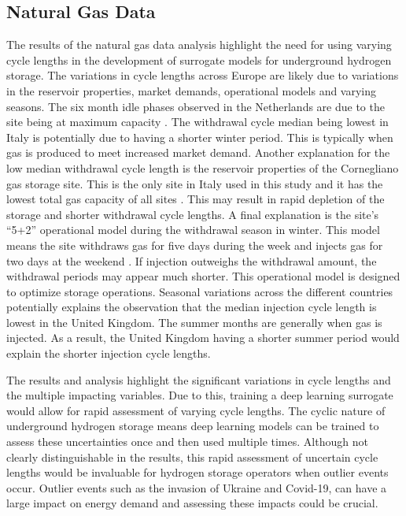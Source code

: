 \subsection{Natural Gas Data}
The results of the natural gas data analysis highlight the need for using varying cycle lengths in the development of surrogate models for underground hydrogen storage. The variations in cycle lengths across Europe are likely due to variations in the reservoir properties, market demands, operational models and varying seasons. The six month idle phases observed in the Netherlands are due to the site being at maximum capacity \citep{AGSI_data}. The withdrawal cycle median being lowest in Italy is potentially due to having a shorter winter period. This is typically  when gas is produced to meet increased market demand. Another explanation for the low median withdrawal cycle length is the reservoir properties of the  Cornegliano gas storage site. This is the only site in Italy used in this study and it has the lowest total gas capacity of all sites \citep{AGSI_data}. This may result in rapid depletion of the storage and shorter withdrawal cycle lengths. A final explanation is the site's ``5+2'' operational model during the withdrawal season in winter. This model means the site withdraws gas for five days during the week and injects gas for two days at the weekend \citep{Italy_UGS}. If injection outweighs the withdrawal amount, the withdrawal periods may appear much shorter. This operational model is designed to optimize storage operations. Seasonal variations across the different countries potentially explains the observation that the median injection cycle length is lowest in the United Kingdom. The summer months are generally when gas is injected. As a result, the United Kingdom having a shorter summer period would explain the shorter injection cycle lengths. 

The results and analysis highlight the significant variations in cycle lengths and the multiple impacting variables. Due to this, training a deep learning surrogate would allow for rapid assessment of varying cycle lengths. The cyclic nature of underground hydrogen storage means deep learning models can be trained to assess these uncertainties once and then used multiple times. Although not clearly distinguishable in the results, this rapid assessment of uncertain cycle lengths would be invaluable for hydrogen storage operators when outlier events occur. Outlier events such as the invasion of Ukraine and Covid-19, can have a large impact on energy demand and assessing these impacts could be crucial. 


